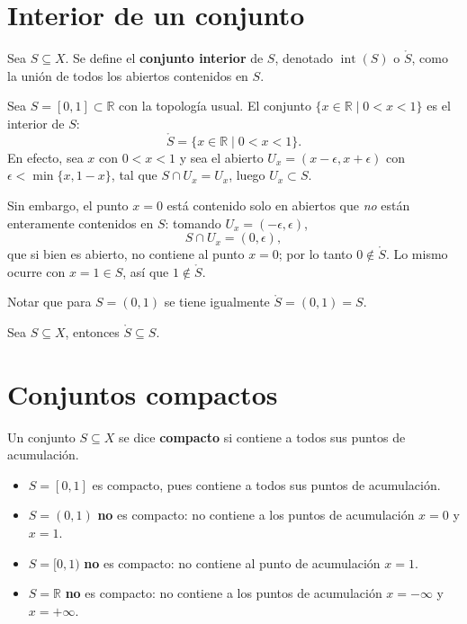 \section{Interior de un conjunto}

\begin{definicion}[Interior]
Sea $S\subseteq X$. Se define el \textbf{conjunto interior} de $S$,
denotado $\operatorname{int}(S)$ o $\mathring{S}$, como la unión de todos
los abiertos contenidos en $S$.
\end{definicion}

\begin{ejemplo}
Sea $S=[0,1]\subset\mathbb{R}$ con la topología usual. El conjunto
$\{x\in\mathbb{R} \mid 0<x<1\}$ es el interior de $S$:
\[
\mathring{S} = \{x\in\mathbb{R}\mid 0<x<1\}.
\]
En efecto, sea $x$ con $0<x<1$ y sea el abierto
$U_x=(x-\epsilon,x+\epsilon)$ con $\epsilon<\min\{x,1-x\}$, tal que
$S\cap U_x = U_x$, luego $U_x\subset S$.

Sin embargo, el punto $x=0$ está contenido solo en abiertos que \emph{no}
están enteramente contenidos en $S$: tomando $U_x=(-\epsilon,\epsilon)$,
\[
S\cap U_x = (0,\epsilon),
\]
que si bien es abierto, no contiene al punto $x=0$; por lo tanto
$0\notin\mathring{S}$. Lo mismo ocurre con $x=1\in S$, así que
$1\notin\mathring{S}$.

Notar que para $S=(0,1)$ se tiene igualmente $\mathring{S}=(0,1)=S$.
\end{ejemplo}

\begin{proposicionc}
Sea $S\subseteq X$, entonces $\mathring{S}\subseteq S$.
\end{proposicionc}

\section{Conjuntos compactos}

\begin{definicion}[Compacidad]
Un conjunto $S\subseteq X$ se dice \textbf{compacto} si contiene a todos
sus puntos de acumulación.
\end{definicion}

\begin{ejemplo}
\begin{itemize}
\item $S=[0,1]$ es compacto, pues contiene a todos sus puntos de
acumulación.
\item $S=(0,1)$ \textbf{no} es compacto: no contiene a los puntos de
acumulación $x=0$ y $x=1$.
\item $S=[0,1)$ \textbf{no} es compacto: no contiene al punto de
acumulación $x=1$.
\item $S=\mathbb{R}$ \textbf{no} es compacto: no contiene a los puntos de
acumulación $x=-\infty$ y $x=+\infty$.
\end{itemize}
\end{ejemplo}

